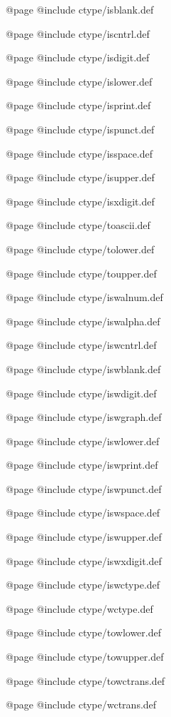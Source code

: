 @page
@include ctype/isblank.def

@page
@include ctype/iscntrl.def

@page
@include ctype/isdigit.def

@page
@include ctype/islower.def

@page
@include ctype/isprint.def

@page
@include ctype/ispunct.def

@page
@include ctype/isspace.def

@page
@include ctype/isupper.def

@page
@include ctype/isxdigit.def

@page
@include ctype/toascii.def

@page
@include ctype/tolower.def

@page
@include ctype/toupper.def

@page
@include ctype/iswalnum.def

@page
@include ctype/iswalpha.def

@page
@include ctype/iswcntrl.def

@page
@include ctype/iswblank.def

@page
@include ctype/iswdigit.def

@page
@include ctype/iswgraph.def

@page
@include ctype/iswlower.def

@page
@include ctype/iswprint.def

@page
@include ctype/iswpunct.def

@page
@include ctype/iswspace.def

@page
@include ctype/iswupper.def

@page
@include ctype/iswxdigit.def

@page
@include ctype/iswctype.def

@page
@include ctype/wctype.def

@page
@include ctype/towlower.def

@page
@include ctype/towupper.def

@page
@include ctype/towctrans.def

@page
@include ctype/wctrans.def

